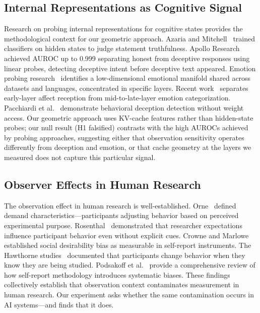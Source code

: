 \documentclass[11pt,a4paper]{article}
\begin{document}
\subsection{Internal Representations as Cognitive Signal}

Research on probing internal representations for cognitive states provides the methodological context for our geometric approach. Azaria and Mitchell~\cite{azaria2023truthfulness} trained classifiers on hidden states to judge statement truthfulness. Apollo Research~\cite{apollo2025deception} achieved AUROC up to 0.999 separating honest from deceptive responses using linear probes, detecting deceptive intent before deceptive text appeared. Emotion probing research~\cite{emotion2025probing} identifies a low-dimensional emotional manifold shared across datasets and languages, concentrated in specific layers. Recent work~\cite{whethernotwhich2026} separates early-layer affect reception from mid-to-late-layer emotion categorization. Pacchiardi et al.~\cite{pacchiardi2023deception} demonstrate behavioral deception detection without weight access. Our geometric approach uses KV-cache features rather than hidden-state probes; our null result (H1 falsified) contrasts with the high AUROCs achieved by probing approaches, suggesting either that observation sensitivity operates differently from deception and emotion, or that cache geometry at the layers we measured does not capture this particular signal.

\subsection{Observer Effects in Human Research}

The observation effect in human research is well-established. Orne~\cite{orne1962demand} defined demand characteristics---participants adjusting behavior based on perceived experimental purpose. Rosenthal~\cite{rosenthal1966experimenter} demonstrated that researcher expectations influence participant behavior even without explicit cues. Crowne and Marlowe~\cite{crowne1960social} established social desirability bias as measurable in self-report instruments. The Hawthorne studies~\cite{mayo1933human,landsberger1958hawthorne} documented that participants change behavior when they know they are being studied. Podsakoff et al.~\cite{podsakoff2003common} provide a comprehensive review of how self-report methodology introduces systematic biases. These findings collectively establish that observation context contaminates measurement in human research. Our experiment asks whether the same contamination occurs in AI systems---and finds that it does.
\end{document}
